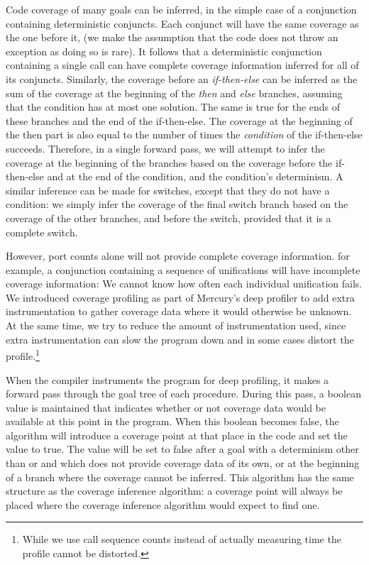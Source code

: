 Code coverage of many goals can be inferred,
in the simple case of a conjunction containing deterministic conjuncts.
Each conjunct will have the same coverage as the one before it,
(we make the assumption that the code does not throw an exception
as doing so is rare).
It follows that a deterministic conjunction containing a single call
can have complete coverage information inferred for all of its conjuncts.
Similarly,
the coverage before an \emph{if-then-else} can be inferred as the sum
of the coverage at the beginning of the \emph{then} and \emph{else}
branches,
assuming that the condition has at most one solution.
The same is true for the ends of these branches and the end of the
if-then-else.
The coverage at the beginning of the then part is also equal to the
number of times the \emph{condition} of the if-then-else succeeds.
Therefore,
in a single forward pass,
we will attempt to infer the coverage at the beginning of the branches
based on the coverage before the if-then-else and at the end of the
condition,
and the condition's determinism.
A similar inference can be made for switches,
except that they do not have a condition:
we simply infer the
coverage of the final switch branch based on the coverage of the other
branches,
and before the switch,
provided that it is a complete switch.

However, port counts alone will not provide complete coverage information.
for example, a conjunction containing a sequence of \dsemidet
unifications will have incomplete coverage information:
We cannot know how often each individual unification fails.
We introduced coverage profiling as part of Mercury's deep profiler to
add extra instrumentation to gather coverage data where it would
otherwise be unknown.
At the same time, we try to reduce the amount of instrumentation used,
since extra instrumentation can slow the program down and in some cases
distort the profile.\footnote{While we use call sequence counts
instead of actually measuring time the profile
cannot be distorted.}

When the compiler instruments the program for deep profiling,
it makes a forward pass through the goal tree of each procedure.
During this pass,
a boolean value is maintained that indicates whether or not coverage
data would be available at this point in the program.
When this boolean becomes false,
the algorithm will introduce a coverage point at that place in the code
and set the value to true.
The value will be set to false after a goal with a determinism other than
\ddet or \dccmulti and which does not provide coverage data of its own,
or at the beginning of a branch where the coverage cannot be inferred.
This algorithm has the same structure as the coverage inference
algorithm:
a coverage point will always be placed where the coverage inference
algorithm would expect to find one.

